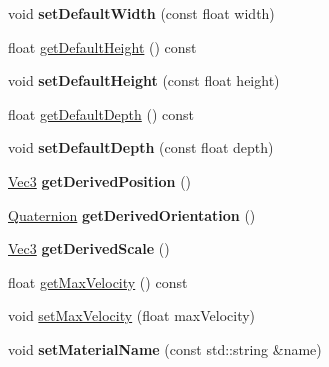 \begin{DoxyCompactItemize}
\item 
\mbox{\label{classPUParticleSystem3D_af0a612067e6d21fb9b78198053966610}} 
void {\bfseries set\+Default\+Width} (const float width)
\item 
float \hyperlink{classPUParticleSystem3D_aa84fcaa662c5338f3e68abf8be181405}{get\+Default\+Height} () const
\item 
\mbox{\label{classPUParticleSystem3D_a654a99f4a4100b6ce0bdb435880d8904}} 
void {\bfseries set\+Default\+Height} (const float height)
\item 
float \hyperlink{classPUParticleSystem3D_a81c8c0bd0d0f40efa06c42bea476e9bf}{get\+Default\+Depth} () const
\item 
\mbox{\label{classPUParticleSystem3D_ad23c7ed7c6cddc14d77f8a9b030b8c4d}} 
void {\bfseries set\+Default\+Depth} (const float depth)
\item 
\mbox{\label{classPUParticleSystem3D_a3a02f6b0ee0b5174d2408aa8ed6a31a9}} 
\hyperlink{classVec3}{Vec3} {\bfseries get\+Derived\+Position} ()
\item 
\mbox{\label{classPUParticleSystem3D_a9d191c59d0a814b2d05a715f3db8c5e9}} 
\hyperlink{classQuaternion}{Quaternion} {\bfseries get\+Derived\+Orientation} ()
\item 
\mbox{\label{classPUParticleSystem3D_abe3e42183fc83f625c79aebefaa794a9}} 
\hyperlink{classVec3}{Vec3} {\bfseries get\+Derived\+Scale} ()
\item 
float \hyperlink{classPUParticleSystem3D_a37e80a563fc36e85af5dd32c9ae75eae}{get\+Max\+Velocity} () const
\item 
void \hyperlink{classPUParticleSystem3D_aa3c122c37511ee36d79854cf6c488022}{set\+Max\+Velocity} (float max\+Velocity)
\item 
\mbox{\label{classPUParticleSystem3D_abdb451552558f9bc88308de10013c932}} 
void {\bfseries set\+Material\+Name} (const std\+::string \&name)
\item 
\mbox{\label{classPUParticleSystem3D_a8025f1e86818361e4c9dc5042a9dc658}} 

\end{DoxyCompactItemize}
